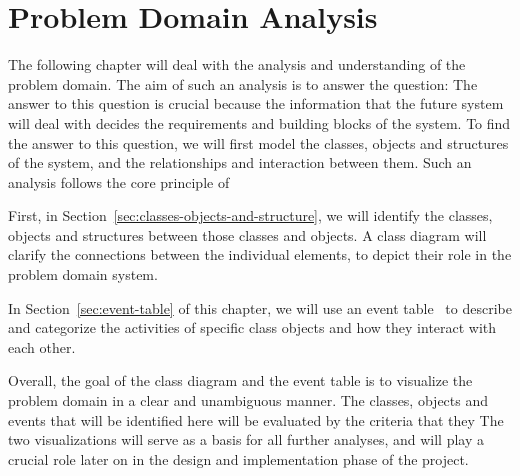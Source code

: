 \chapter{Problem Domain Analysis}\label{ch:problem-domain-analysis}

The following chapter will deal with the analysis and understanding of the problem domain.
The aim of such an analysis is to answer the question:
The answer to this question is crucial because the information that the future system will deal with decides the
requirements and building blocks of the system.
To find the answer to this question, we will first model the classes, objects and structures of the system, and the
relationships and interaction between them.
Such an analysis follows the core principle of

First, in Section~\ref{sec:classes-objects-and-structure}, we will identify the classes, objects and structures between
those classes and objects.
A class diagram will clarify the connections between the individual elements, to depict their role in the problem domain
system.

In Section~\ref{sec:event-table} of this chapter, we will use an event table~\cite[52]{mathiassen2018} to describe and
categorize the activities of specific class objects and how they interact with each other.

Overall, the goal of the class diagram and the event table is to visualize the problem domain in a clear and unambiguous
manner.
The classes, objects and events that will be identified here will be evaluated by the criteria that they
The two visualizations will serve as a basis for all further analyses, and will play a crucial role later on in the
design and implementation phase of the project.



